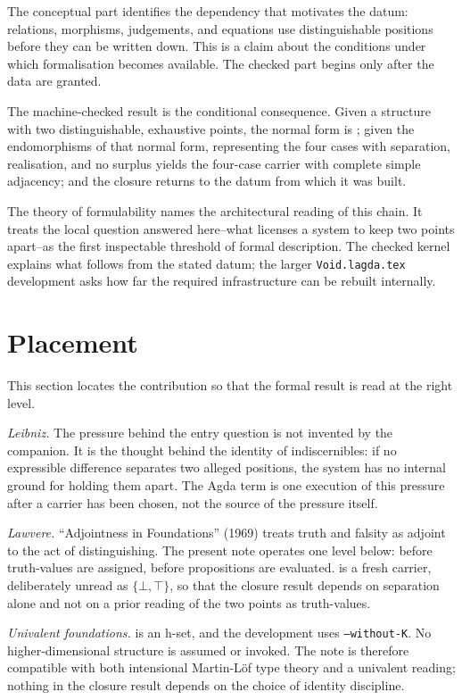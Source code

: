 \documentclass[11pt]{article}
\begin{document}
The conceptual part identifies the dependency that motivates the datum:
relations, morphisms, judgements, and equations use distinguishable
positions before they can be written down.  This is a claim about the
conditions under which formalisation becomes available.  The checked
part begins only after the data are granted.

The machine-checked result is the conditional consequence.  Given a
structure with two distinguishable, exhaustive points, the normal form
is ; given the endomorphisms of that normal form,
representing the four cases with separation, realisation, and no surplus
yields the four-case carrier with complete simple adjacency; and the
closure returns to the datum from which it was built.

The theory of formulability names the architectural reading of this
chain.  It treats the local question answered here--what licenses a
system to keep two points apart--as the first inspectable threshold of
formal description.  The checked kernel explains what follows from the
stated datum; the larger \texttt{Void.lagda.tex} development asks how
far the required infrastructure can be rebuilt internally.

\section{Placement}

This section locates the contribution so that the formal result is read
at the right level.

\emph{Leibniz.}  The pressure behind the entry question is not invented
by the companion.  It is the thought behind the identity of
indiscernibles: if no
expressible difference separates two alleged positions, the system has
no internal ground for holding them apart.  The Agda term
 is one execution of
this pressure after a carrier has been chosen, not the source of the
pressure itself.

\emph{Lawvere.}  ``Adjointness in Foundations'' (1969) treats truth
and falsity as adjoint to the act of distinguishing.  The present note
operates one level below: before truth-values are assigned, before
propositions are evaluated.   is a fresh carrier,
deliberately unread as $\{\bot,\top\}$, so that the closure result
depends on separation alone and not on a prior reading of the two
points as truth-values.

\emph{Univalent foundations.}   is an h-set, and the
development uses \texttt{--without-K}.  No higher-dimensional
structure is assumed or invoked.  The note is therefore compatible
with both intensional Martin-Löf type theory and a univalent reading;
nothing in the closure result depends on the choice of identity
discipline.
\end{document}

